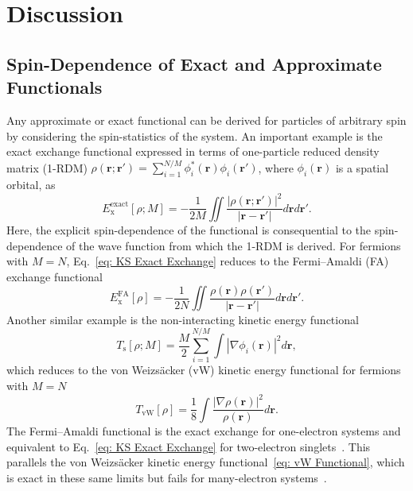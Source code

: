 \documentclass[%
 reprint,
 amsmath,amssymb,
 aps,
pra,
]{revtex4-2}
\begin{document}
\section{Discussion}

\subsection{Spin-Dependence of Exact and Approximate Functionals}

Any approximate or exact functional can be derived for particles of arbitrary spin by considering the spin-statistics of the system. An important example is the exact exchange functional expressed in terms of one-particle reduced density matrix (1-RDM) $\rho(\mathbf{r};\mathbf{r}') = \sum_{i=1}^{N/M} \phi_i^*(\mathbf{r}) \phi_i(\mathbf{r}')$, where $\phi_i(\mathbf{r})$ is a spatial orbital, as
\begin{equation}
    E_{\text{x}}^{\text{exact}}
    [\rho; M]
    =
    -\frac{1}{2M}
    \iint
    \frac{|\rho(\mathbf{r};\mathbf{r}')|^2}
    {|\mathbf{r}-\mathbf{r}'|}
    d\mathbf{r}d\mathbf{r}'.
    \label{eq: KS Exact Exchange}
\end{equation}
Here, the explicit spin-dependence of the functional is consequential to the spin-dependence of the wave function from which the 1-RDM is derived. For fermions with $M=N$, Eq.~\eqref{eq: KS Exact Exchange} reduces to the Fermi--Amaldi (FA) exchange functional~\cite{Fermi.1934.MRAI.6.117}
\begin{equation}
    E_{\text{x}}^{\text{FA}}
    [\rho]
    =
    -\frac{1}{2N}
    \iint
    \frac{\rho(\mathbf{r})\rho(\mathbf{r}')}{|\mathbf{r}-\mathbf{r}'|}
    d\mathbf{r}d\mathbf{r}'.
    \label{eq: FA Functional}
\end{equation}
Another similar example is the non-interacting kinetic energy functional 
\begin{equation}
    T_{\text{s}}[\rho; M]
    =
    \frac{M}{2}
    \sum^{N/M}_{i=1}
    \int
    |\nabla \phi_i(\mathbf{r})|^2
    d\mathbf{r},
\end{equation}
which reduces to the von Weizsäcker (vW) kinetic energy functional for fermions with $M=N$~\cite{Weizsäcker.1935.ZP.96.431,Parr.1989.density}
\begin{equation}
    T_{\text{vW}}[\rho]
    =
    \frac{1}{8}
    \int
    \frac{|\nabla \rho(\mathbf{r})|^2}{\rho(\mathbf{r})}
    d\mathbf{r}.\label{eq: vW Functional}
\end{equation}
The Fermi--Amaldi functional is the exact exchange for one-electron systems and equivalent to Eq.~\eqref{eq: KS Exact Exchange} for two-electron singlets~\cite{Ayers.2005.MP.103.2061, Bosko.2023.JCP.159.131101}. This parallels the von Weizsäcker kinetic energy functional~\eqref{eq: vW Functional}, which is exact in these same limits but fails for many-electron systems~\cite{Weizsäcker.1935.ZP.96.431, Parr.1989.density}. 
\end{document}

